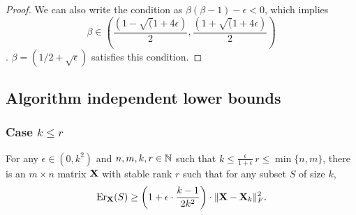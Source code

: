 \documentclass{article}
\begin{document}
\begin{proof}
  	We can also write the condition as $\beta (\beta -1) -\epsilon < 0$, which implies
  	\[\beta \in \left(\frac{( 1- \sqrt(1+ 4 \epsilon)}{2}, \frac{( 1+ \sqrt(1+ 4 \epsilon)}{2} \right)\]. $\beta = (1/2 + \sqrt{\epsilon})$ satisfies this condition.
  	
  	
  \end{proof}
  
  
 \subsection{Algorithm independent lower bounds} 
  \subsubsection{Case $k\leq r$}
\begin{theorem}\label{t:lower-small-k}
  For any $\epsilon\in(0,k^2)$ and $n,m,k,r\in\mathbb N$ such
  that $k\leq\frac{\epsilon}{1+\epsilon}\,r\leq\min\{n,m\}$, there is
  an $m\times n$ matrix $\mathbf X$ with stable rank  
  $r$ such that for any subset $S$ of size $k$,
  \begin{align*}
    \mathrm{Er}_\mathbf X(S) \geq \bigg(1+\epsilon\cdot \frac{k-1}{2k^2}\bigg)\cdot \|\mathbf X-\mathbf X_k\|_F^2.
  \end{align*}
\end{theorem}
\end{document}
